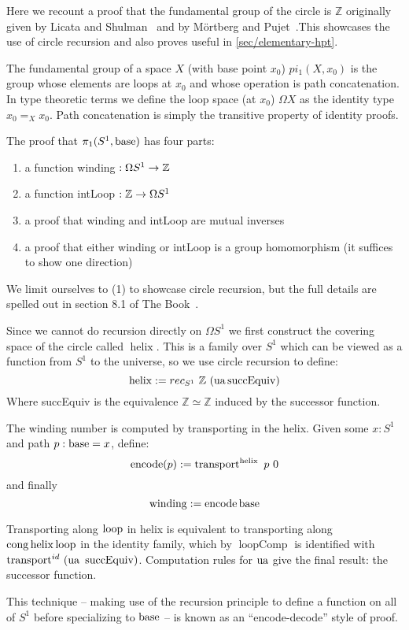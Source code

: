 Here we recount a proof that the fundamental group of the circle is $\mathbb{Z}$
originally given by Licata and Shulman~\cite{licata2013circle} and by M\"ortberg
and Pujet~\cite{mortberg2020cubical}.This showcases the use of circle
recursion and also proves useful in \autoref{sec/elementary-hpt}.

The fundamental group of a space $X$ (with base point $x_0$) $pi_1(X, x_0)$ is
the group whose elements are loops at $x_0$ and whose operation is path
concatenation. In type theoretic terms we define the loop space (at $x_0$) $\Omega X$ as the
identity type $x_0 =_X x_0$. Path concatenation is simply the transitive
property of identity proofs.

The proof that $\pi_1(S^1, \operatorname{base})$ has four parts:
\begin{enumerate}
  \item a function winding $: \Omega S^1 \rightarrow \mathbb{Z}$
  \item a function intLoop $: \mathbb{Z} \rightarrow \Omega S^1$
  \item a proof that winding and intLoop are mutual inverses
  \item a proof that either winding or intLoop is a group homomorphism (it
    suffices to show one direction)
\end{enumerate}
We limit ourselves to (1) to showcase circle recursion, but the full
details are spelled out in section 8.1 of The Book~\cite{hottbook}.

Since we cannot do recursion directly on $\Omega S^1$ we first construct the
covering space of the circle called $\operatorname{helix}$. This is a family over $S^1$
which can be viewed as a function from $S^1$ to the universe, so we use circle
recursion to define:
\[
  \operatorname{helix} := rec_{S^1} ~ \mathbb{Z} ~ (\operatorname{ua} \operatorname{succEquiv})
\]
Where succEquiv is the equivalence $\mathbb{Z} \simeq \mathbb{Z}$ induced by the
successor function.

The winding number is computed by transporting in the helix. Given some $x:S^1$
and path $p : \operatorname{base} = x$, define:
\[
  \operatorname{encode}(p) := \operatorname{transport}^{\operatorname{helix}}~p~0
\]
and finally
\[
  \operatorname{winding} := \operatorname{encode} \operatorname{base}
\]

Transporting along $\operatorname{loop}$ in helix is equivalent to transporting along
$\operatorname{cong} \operatorname{helix} \operatorname{loop}$ in the identity family, which by $\operatorname{loopComp}$
is identified with $\operatorname{transport}^{id}~(\operatorname{ua}~\operatorname{succEquiv})$. Computation
rules for $\operatorname{ua}$ give the final result: the successor function.

This technique -- making use of the recursion principle to define a function on
all of $S^1$ before specializing to $\operatorname{base}$ -- is known as an ``encode-decode''
style of proof.